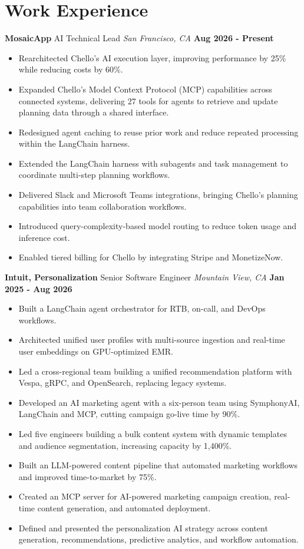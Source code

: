 \documentclass[10pt, letterpaper]{article}
\newcommand{\jobentry}[4]{
  \noindent\textbf{#1} \hfill #2 \hfill \textit{#3} \hfill \textbf{#4}
}
\begin{document}
\section{Work Experience}
\jobentry{MosaicApp}{AI Technical Lead}{San Francisco, CA}{Aug 2026 - Present}
\begin{itemize}
\item Rearchitected Chello's AI execution layer, improving performance by 25\% while reducing costs by 60\%.
\item Expanded Chello's Model Context Protocol (MCP) capabilities across connected systems, delivering 27 tools for agents to retrieve and update planning data through a shared interface.
\item Redesigned agent caching to reuse prior work and reduce repeated processing within the LangChain harness.
\item Extended the LangChain harness with subagents and task management to coordinate multi-step planning workflows.
\item Delivered Slack and Microsoft Teams integrations, bringing Chello's planning capabilities into team collaboration workflows.
\item Introduced query-complexity-based model routing to reduce token usage and inference cost.
\item Enabled tiered billing for Chello by integrating Stripe and MonetizeNow.
\end{itemize}
\jobentry{Intuit, Personalization}{Senior Software Engineer}{Mountain View, CA}{Jan 2025 - Aug 2026}
\begin{itemize}
\item Built a LangChain agent orchestrator for RTB, on-call, and DevOps workflows.
\item Architected unified user profiles with multi-source ingestion and real-time user embeddings on GPU-optimized EMR.
\item Led a cross-regional team building a unified recommendation platform with Vespa, gRPC, and OpenSearch, replacing legacy systems.
\item Developed an AI marketing agent with a six-person team using SymphonyAI, LangChain and MCP, cutting campaign go-live time by 90\%.
\item Led five engineers building a bulk content system with dynamic templates and audience segmentation, increasing capacity by 1,400\%.
\item Built an LLM-powered content pipeline that automated marketing workflows and improved time-to-market by 75\%.
\item Created an MCP server for AI-powered marketing campaign creation, real-time content generation, and automated deployment.
\item Defined and presented the personalization AI strategy across content generation, recommendations, predictive analytics, and workflow automation.
\end{itemize}
\end{document}
